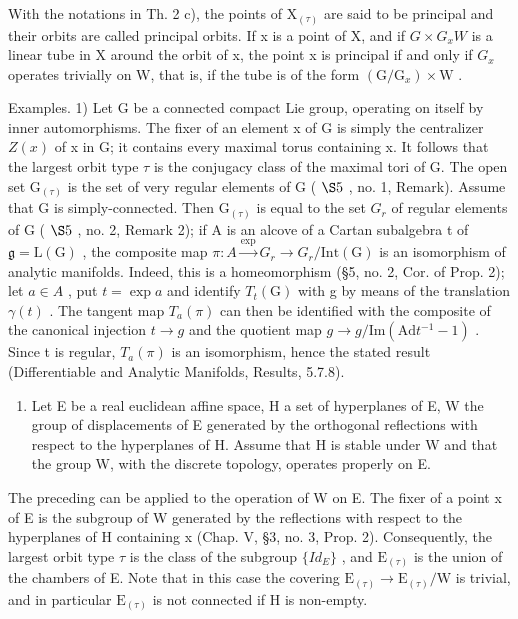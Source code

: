 With the notations in Th. 2 c), the points of \(\mathrm{X}_{(\tau)}\) are said to be principal and their orbits are called principal orbits. If x is a point of X, and if \(G \times G_{x}W\) is a linear tube in X around the orbit of x, the point x is principal if and only if \(G_{x}\) operates trivially on W, that is, if the tube is of the form \((\mathrm{G}/\mathrm{G}_{x}) \times \mathrm{W}\) .

Examples. 1) Let G be a connected compact Lie group, operating on itself by inner automorphisms. The fixer of an element x of G is simply the centralizer \(Z(x)\) of x in G; it contains every maximal torus containing x. It follows that the largest orbit type \(\tau\) is the conjugacy class of the maximal tori of G. The open set \(\mathrm{G}_{(\tau)}\) is the set of very regular elements of G ( \(\S5\) , no. 1, Remark). Assume that G is simply-connected. Then \(\mathrm{G}_{(\tau)}\) is equal to the set \(G_{r}\) of regular elements of G ( \(\S5\) , no. 2, Remark 2); if A is an alcove of a Cartan subalgebra t of \(\mathfrak{g} = \mathrm{L}(\mathrm{G})\) , the composite map \(\pi: A \xrightarrow{\exp} G_{r} \longrightarrow G_{r}/\mathrm{Int}(\mathrm{G})\) is an isomorphism of analytic manifolds. Indeed, this is a homeomorphism (§5, no. 2, Cor. of Prop. 2); let \(a \in A\) , put \(t = \exp a\) and identify \(T_{t}(\mathrm{G})\) with g by means of the translation \(\gamma(t)\) . The tangent map \(T_{a}(\pi)\) can then be identified with the composite of the canonical injection \(t \to g\) and the quotient map \(g \to g/\mathrm{Im}(\mathrm{Ad} t^{-1} - 1)\) . Since t is regular, \(T_{a}(\pi)\) is an isomorphism, hence the stated result (Differentiable and Analytic Manifolds, Results, 5.7.8).

\begin{enumerate}
\def\labelenumi{\arabic{enumi})}
\setcounter{enumi}{1}
\tightlist
\item
  Let E be a real euclidean affine space, H a set of hyperplanes of E, W the group of displacements of E generated by the orthogonal reflections with respect to the hyperplanes of H. Assume that H is stable under W and that the group W, with the discrete topology, operates properly on E.
\end{enumerate}

The preceding can be applied to the operation of W on E. The fixer of a point x of E is the subgroup of W generated by the reflections with respect to the hyperplanes of H containing x (Chap. V, §3, no. 3, Prop. 2). Consequently, the largest orbit type \(\tau\) is the class of the subgroup \(\{Id_{E}\}\) , and \(\mathrm{E}_{(\tau)}\) is the union of the chambers of E. Note that in this case the covering \(\mathrm{E}_{(\tau)} \to \mathrm{E}_{(\tau)}/\mathrm{W}\) is trivial, and in particular \(\mathrm{E}_{(\tau)}\) is not connected if H is non-empty.

